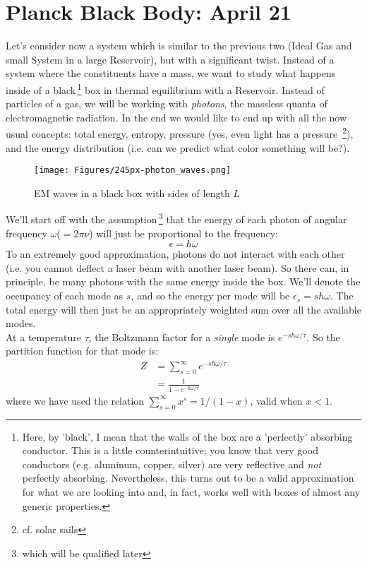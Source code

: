 \section{Planck Black Body: April 21}

Let's consider now a system which is similar to the previous two (Ideal Gas and small System in a large Reservoir), but with a significant twist. Instead of a system where the constituents have a mass, we want to study what happens inside of a 
black\,\footnote{Here, by 'black', I mean that the walls of the box are a 'perfectly' absorbing conductor. This is a little counterintuitive; you know that very good conductors (e.g. aluminum, copper, silver) are very reflective and \emph{not} perfectly absorbing. Nevertheless, this turns out to be a valid approximation for what we are looking into and, in fact, works well with boxes of almost any generic properties.} box in thermal equilibrium with a Reservoir. Instead of particles of a gas, we will be working with \textit{photons}, the massless quanta of electromagnetic radiation. In the end we would like to end up with all the now usual concepts: total energy, entropy, pressure (yes, even light has a 
pressure~\footnote{cf. solar sails}), and the energy distribution (i.e. can 
we predict what color something will be?). \\

\begin{figure}[h]
\centering
\texttt{[image: Figures/245px-photon\_waves.png]}
\caption{EM waves in a black box with sides of length $L$}
\end{figure}


We'll start off with the assumption\,\footnote{which will be qualified later} that the energy of each photon of angular frequency $\omega$($=2 \pi \nu$) will just be proportional to the frequency:
\begin{equation}
\epsilon = \hbar \omega
\end{equation}
To an extremely good approximation, photons do not interact with each other (i.e. you cannot deflect a laser beam with another laser beam). So there can, in principle, be many photons with the same energy inside the box. We'll denote the occupancy of each mode as $s$, and so the energy per mode will be $\epsilon_s = s \hbar \omega$. The total energy will then just be an appropriately weighted sum over all the available modes.\\

At a temperature $\tau$, the Boltzmann factor for a \textit{single} mode 
is $e^{-s \hbar \omega / \tau}$. So the partition function for that mode is:
\begin{align}
Z &= \sum_{s=0}^{\infty} e^{-s \hbar \omega / \tau} \\
  &= \frac{1}{1 - e^{-\hbar \omega / \tau}}
\label{eq:PartPlanck}
\end{align}
where we have used the relation $\sum_{s=0}^{\infty} x^s = 1/(1-x)$, 
valid when $x < 1$. \\

